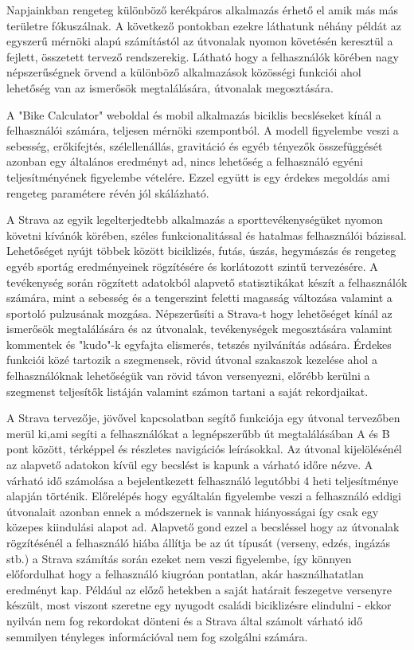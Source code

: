 \label{Chap:tema}

Napjainkban rengeteg különböző kerékpáros alkalmazás érhető el amik más más területre fókuszálnak. A következő pontokban ezekre láthatunk néhány példát az egyszerű mérnöki alapú számítástól az útvonalak nyomon követésén keresztül a fejlett, összetett tervező rendszerekig. Látható hogy a felhasználók körében nagy népszerűségnek örvend a különböző alkalmazások közösségi funkciói ahol lehetőség van az ismerősök megtalálására, útvonalak megosztására.  

A "Bike Calculator" \cite{bikecalculator} weboldal és mobil alkalmazás biciklis becsléseket kínál a felhasználói számára, teljesen mérnöki szempontból. A modell figyelembe veszi a sebesség, erőkifejtés, szélellenállás, gravitáció és egyéb tényezők összefüggését azonban egy általános eredményt ad, nincs lehetőség a felhasználó egyéni teljesítményének figyelembe vételére. Ezzel együtt is egy érdekes megoldás ami rengeteg paramétere révén jól skálázható.

A Strava \cite{strava} az egyik legelterjedtebb alkalmazás a sporttevékenységüket nyomon követni kívánók körében, széles funkcionalitással és hatalmas felhasználói bázissal. Lehetőséget nyújt többek között biciklizés, futás, úszás, hegymászás és rengeteg egyéb sportág eredményeinek rögzítésére és korlátozott szintű tervezésére. A tevékenység során rögzített adatokból alapvető statisztikákat készít a felhasználók számára, mint a sebesség és a tengerszint feletti magasság változása valamint a sportoló pulzusának mozgása. Népszerűsíti a Strava-t hogy lehetőséget kínál az ismerősök megtalálására és az útvonalak, tevékenységek megosztására valamint kommentek és "kudo"-k egyfajta elismerés, tetszés nyilvánítás adására. Érdekes funkciói közé tartozik a szegmensek, rövid útvonal szakaszok kezelése ahol a felhasználóknak lehetőségük van rövid távon versenyezni, előrébb kerülni a szegmenst teljesítők listáján valamint számon tartani a saját rekordjaikat. 

A Strava tervezője, jövővel kapcsolatban segítő funkciója egy útvonal tervezőben merül ki,ami segíti a felhasználókat a legnépszerűbb út megtalálásában A és B pont között, térképpel és részletes navigációs leírásokkal. Az útvonal kijelölésénél az alapvető adatokon kívül egy becslést is kapunk a várható időre nézve. A várható idő számolása a bejelentkezett felhasználó legutóbbi 4 heti teljesítménye alapján történik. Előrelépés hogy egyáltalán figyelembe veszi a felhasználó eddigi útvonalait azonban ennek a módszernek is vannak hiányosságai így csak egy közepes kiindulási alapot ad. Alapvető gond ezzel a becsléssel hogy az útvonalak rögzítésénél a felhasználó hiába állítja be az út típusát (verseny, edzés, ingázás stb.) a Strava számítás során ezeket nem veszi figyelembe, így könnyen előfordulhat hogy a felhasználó kiugróan pontatlan, akár használhatatlan eredményt kap. Például az előző hetekben a saját határait feszegetve versenyre készült, most viszont szeretne egy nyugodt családi biciklizésre elindulni - ekkor nyilván nem fog rekordokat dönteni és a Strava által számolt várható idő semmilyen tényleges információval nem fog szolgálni számára.


